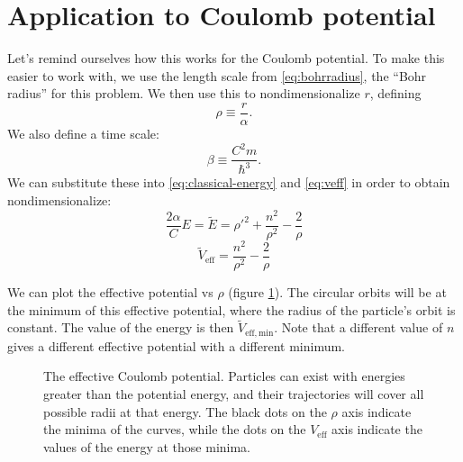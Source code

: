 \documentclass[12pt,twoside]{reedthesis}
\newcommand{\eqn}[1]{\begin{equation}#1\end{equation}}
\begin{document}
\section{Application to Coulomb potential}
Let's remind ourselves how this works for the Coulomb potential. To make this easier to work with, we use the length scale from \eqref{eq:bohrradius}, the ``Bohr radius'' for this problem. We then use this to nondimensionalize $r$, defining
\begin{equation}
\rho \equiv \frac{r}{\alpha}\mbox{.}
\label{eq:rho}
\end{equation}
We also define a time scale:
\begin{equation}
\beta \equiv \frac{C^2m}{\hbar^3}\mbox{.}
\label{eq:beta}
\end{equation}
We can substitute these into \eqref{eq:classical-energy} and \eqref{eq:veff} in order to obtain nondimensionalize:
\eqn{
\frac{2 \alpha}{C}E = \tilde{E}= \rho '^2 + \frac{n^2}{\rho^2}-\frac{2}{\rho}
\label{eq:energy-nondim}
}
\eqn{
\tilde{V}_{\mathrm{eff}} = \frac{n^2}{\rho^2}-\frac{2}{\rho}
\label{eq:veff-nondim}
}

We can plot the effective potential vs $\rho$ (figure \ref{fig:hveff}). The circular orbits will be at the minimum of this effective potential, where the radius of the particle's orbit is constant. The value of the energy is then $\tilde{V}_{\mathrm{eff,min}}$. Note that a different value of $n$ gives a different effective potential with a different minimum. 

\begin{figure}[h]
\caption[The effective Coulomb potential]{The effective Coulomb potential. Particles can exist with energies greater than the potential energy, and their trajectories will cover all possible radii at that energy. The black dots on the $\rho$ axis indicate the minima of the curves, while the dots on the $V_{\mathrm{eff}}$ axis indicate the values of the energy at those minima.}
\label{fig:hveff}
\end{figure}
\end{document}
